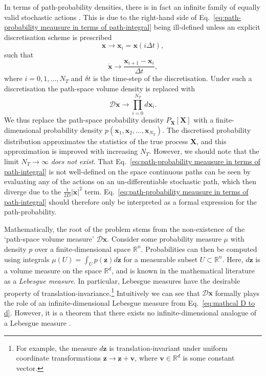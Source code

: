 In terms of path-probability densities, there is in fact an infinite family of equally valid stochastic actions \citep{gladrowExperimentalMeasurementRelative2021a}. This is due to the right-hand side of Eq.~\ref{eq:path-probability meausure in terms of path-integral} being ill-defined unless an explicit discretisation scheme is prescribed
\begin{equation}
\mathbf{x} \longrightarrow \mathbf{x}_i = \mathbf{x}(i \Delta t),
\end{equation}
such that
\begin{equation}
\dot{\mathbf{x}} \longrightarrow \frac{\mathbf{x}_{i+1} - \mathbf{x}_i}{\Delta t},
\end{equation}
where $i=0, 1, \dots, N_T$ and $\delta t$ is the time-step of the discretisation. Under such a discretisation the path-space volume density is replaced with
\begin{equation} \label{eq:mathcal D to d}
\mathcal{D}\mathbf{x} \longrightarrow \prod_{i=0}^{N_T} d \mathbf{x}_i.
\end{equation}
We thus replace the path-space probability density $P_\mathbf{X}[\mathbf{X}]$ with a finite-dimensional probability density $p(\mathbf{x}_1, \mathbf{x}_2, \dots, \mathbf{x}_{N_T})$. The discretised probability distribution approximates the statistics of the true process $\mathbf{X}$, and this approximation is improved with increasing $N_T$. However, we should note that the limit $N_T \to \infty$ \textit{does not exist}. That Eq.~\ref{eq:path-probability meausure in terms of path-integral} is not well-defined on the space continuous paths can be seen by evaluating any of the actions on an un-differentiable stochastic path, which then diverge due to the $\frac{1}{2 D} |\dot{\mathbf{x}}|^2$ term. Eq.~\ref{eq:path-probability meausure in terms of path-integral} should therefore only be interpreted as a formal expression for the path-probability.

Mathematically, the root of the problem stems from the non-existence of the `path-space volume measure' $\mathcal{D} \mathbf{x}$. Consider some probability measure $\mu$ with density $p$ over a finite-dimensional space $\mathbb{R}^n$. Probabilities can then be computed using integrals $\mu(U) = \int_U p(\mathbf{z}) d \mathbf{z}$ for a measurable subset  $U \subset \mathbb{R}^n$. Here, $d \mathbf{z}$ is a volume measure on the space $\mathbb{R}^d$, and is known in the mathematical literature as a \textit{Lebesgue measure}. In particular, Lebesgue measures have the desirable property of translation-invariance.\footnote{For example, the measure $d \mathbf{z}$ is translation-invariant under uniform coordinate transformations $\mathbf{z} \to \mathbf{z} + \mathbf{v}$, where $\mathbf{v} \in \mathbb{R}^d$ is some constant vector.} Intuitively we can see that $\mathcal{D} \mathbf{x}$ formally plays the role of an infinite-dimensional Lebesgue measure from Eq.~\ref{eq:mathcal D to d}. However, it is a theorem that there exists no infinite-dimensional analogue of a Lebesgue measure \citep{durrOnsagerMachlupFunctionLagrangian1978, MeasureIntegrationTheory1972}. 

